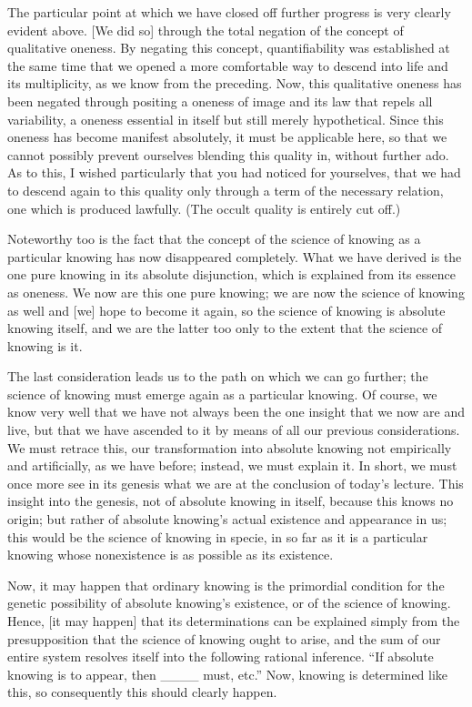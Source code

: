 The particular point at which we have closed off
further progress is very clearly evident above.
[We did so] through the total negation of
the concept of qualitative oneness.
By negating this concept,
quantifiability was established
at the same time that we opened
a more comfortable way to descend
into life and its multiplicity,
as we know from the preceding.
Now, this qualitative oneness has been
negated through positing a oneness of image
and its law that repels all variability,
a oneness essential in itself
but still merely hypothetical.
Since this oneness has become manifest absolutely,
it must be applicable here,
so that we cannot possibly prevent ourselves
blending this quality in, without further ado.
As to this, I wished particularly
that you had noticed for yourselves,
that we had to descend again to this quality
only through a term of the necessary relation,
one which is produced lawfully.
(The occult quality is entirely cut off.)

Noteworthy too is the fact that
the concept of the science of knowing
as a particular knowing has now disappeared completely.
What we have derived is the one pure knowing
in its absolute disjunction,
which is explained from its essence as oneness.
We now are this one pure knowing;
we are now the science of knowing as well
and [we] hope to become it again,
so the science of knowing is absolute knowing itself,
and we are the latter too only to the extent that
the science of knowing is it.

The last consideration leads us to
the path on which we can go further;
the science of knowing must emerge again
as a particular knowing.
Of course, we know very well that
we have not always been the one insight
that we now are and live,
but that we have ascended to it
by means of all our previous considerations.
We must retrace this,
our transformation into absolute knowing
not empirically and artificially, as we have before;
instead, we must explain it.
In short, we must once more see in its genesis
what we are at the conclusion of today's lecture.
This insight into the genesis,
not of absolute knowing in itself,
because this knows no origin;
but rather of absolute knowing's
actual existence and appearance in us;
this would be the science of knowing in specie,
in so far as it is a particular knowing whose
nonexistence is as possible as its existence.

Now, it may happen that
ordinary knowing is
the primordial condition for
the genetic possibility of
absolute knowing's existence,
or of the science of knowing.
Hence, [it may happen] that
its determinations can be explained
simply from the presupposition that
the science of knowing ought to arise,
and the sum of our entire system resolves itself
into the following rational inference.
“If absolute knowing is to appear, then ____ must, etc.”
Now, knowing is determined like this,
so consequently this should clearly happen.

